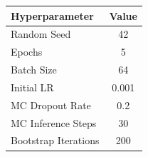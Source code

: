 \begin{tabular}{lc}
\toprule
Hyperparameter & Value \\
\midrule
Random Seed & 42 \\
Epochs & 5 \\
Batch Size & 64 \\
Initial LR & 0.001 \\
MC Dropout Rate & 0.2 \\
MC Inference Steps & 30 \\
Bootstrap Iterations & 200 \\
\bottomrule
\end{tabular}
